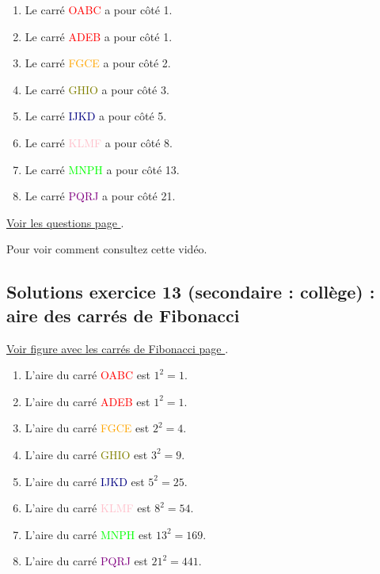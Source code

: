 \begin{enumerate}[label=G\arabic*)]
	\item Le carré \textcolor{red}{OABC} a pour côté 1.
	\item Le carré \textcolor{red}{ADEB} a pour côté 1.
	\item Le carré \textcolor{orange}{FGCE} a pour côté 2.
	\item Le carré \textcolor{olive}{GHIO} a pour côté 3.
	\item Le carré \textcolor{navy}{IJKD} a pour côté 5.
	\item Le carré \textcolor{pink}{KLMF} a pour côté 8.
	\item Le carré \textcolor{lime}{MNPH} a pour côté 13.
	\item Le carré \textcolor{purple}{PQRJ} a pour côté 21.
\end{enumerate}



\hyperref[geom:niveau12]{Voir les questions page \pageref{geom:niveau12}}.

Pour voir comment  consultez cette vidéo.
 
\newpage


\subsection{Solutions exercice 13 (secondaire : collège) : aire des carrés de Fibonacci}

\label{sol:niveau13}

\hyperref[fig:fibo-squares]{Voir figure avec les carrés de Fibonacci page \pageref{fig:fibo-squares}}.

\begin{enumerate}[label=G\arabic*)]
	\item L'aire du carré \textcolor{red}{OABC} est $1^2 = 1$.
	\item L'aire du carré \textcolor{red}{ADEB} est $1^2 = 1$.
	\item L'aire du carré \textcolor{orange}{FGCE} est $2^2 = 4$.
	\item L'aire du carré \textcolor{olive}{GHIO} est $3^2 = 9$.
	\item L'aire du carré \textcolor{navy}{IJKD} est $5^2 = 25$.
	\item L'aire du carré \textcolor{pink}{KLMF} est $8^2 = 54$.
	\item L'aire du carré \textcolor{lime}{MNPH} est $13^2 = 169$.
	\item L'aire du carré \textcolor{purple}{PQRJ} est $21^2 = 441$.
\end{enumerate}


